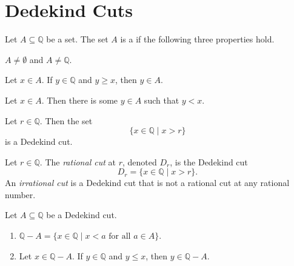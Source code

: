 \section{Dedekind Cuts}
\label{cuts}

\begin{definition} %
	Let $A \subseteq \mathbb{Q}$ be a set. The set $A$ is a \emph{} if the following three properties hold.
	\begin{lenumerate}
		\item \label{cuts:d:cut:a}
		      $A \neq \emptyset$ and $A \neq \mathbb{Q}$.
		\item \label{cuts:d:cut:b}
		      Let $x \in A$. If $y \in \mathbb{Q}$ and $y \geq x$, then $y \in A$.
		\item \label{cuts:d:cut:c}
		      Let $x \in A$. Then there is some $y \in A$ such that $y < x$.
	\end{lenumerate}
\end{definition}

\begin{lemma} %
	Let $r \in \mathbb{Q}$. Then the set
	$$
		\{ x \in \mathbb{Q} \mid x > r \}
	$$
	is a Dedekind cut.
\end{lemma}

\addtocounter{theorem}{1}
\begin{definition} %
	\label{cuts:d:rat_irrat}
	Let $r \in \mathbb{Q}$. The \emph{rational cut} at $r$, denoted $D_{r}$, is the Dedekind cut
	$$
		D_{r} = \{ x \in \mathbb{Q} \mid x > r \}.
	$$
	An \emph{irrational cut} is a Dedekind cut that is not a rational cut at any rational number.
\end{definition}

\begin{lemma} %
	\label{cuts:l:diff}
	Let $A \subseteq \mathbb{Q}$ be a Dedekind cut.
	\begin{enumerate}
		\item \label{cuts:l:diff:1}
		      $\mathbb{Q} - A = \{ x \in \mathbb{Q} \mid x < a \text{ for all } a \in A \}$.
		\item \label{cuts:l:diff:2}
		      Let $x \in \mathbb{Q} - A$. If $y \in \mathbb{Q}$ and $y \leq x$, then $y \in \mathbb{Q} - A$.
	\end{enumerate}
\end{lemma}


